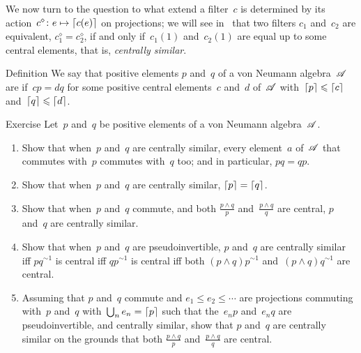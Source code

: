 \documentclass[a]{subfiles}
\begin{document}
\begin{parsec}%
\begin{point}%
We now turn to the question
to what extend a filter~$c$ is determined by
its action~$c^\diamond\colon e\mapsto \left\lceil c(e)\right\rceil$ on projections;
we will see in~\TODO{}
that two filters $c_1$ and~$c_2$
are equivalent, $c_1^\diamond = c_2^\diamond$,
if and only if~$c_1(1)$ and~$c_2(1)$
are equal up to some central elements,
that is, \emph{centrally similar}.
\end{point}
\begin{point}{Definition}%
We say that positive elements $p$ and~$q$ of a von Neumann algebra~$\mathscr{A}$
are 
if~$cp=dq$ for some positive central elements~$c$ and~$d$ of~$\mathscr{A}$
with~$\left\lceil p\right\rceil\leqslant \left\lceil c\right\rceil$
and~$\left\lceil q\right\rceil\leqslant \left\lceil d\right\rceil$.
\end{point}
\begin{point}{Exercise}%
Let~$p$ and~$q$ be positive elements
of a von Neumann algebra~$\mathscr{A}$.
\begin{enumerate}
\item
Show that when~$p$ and~$q$ are centrally similar,
every element~$a$ of~$\mathscr{A}$ that commutes
with~$p$ commutes with~$q$ too;
and in particular, $pq=qp$.
\item
Show that when~$p$ and~$q$ are centrally similar,
$\left\lceil p\right\rceil=\left\lceil q\right\rceil$.
\item
Show that when~$p$ and~$q$ commute,
and both $\frac{p\wedge q}{p}$ 
and~$\frac{p\wedge q}{q}$
are central,
$p$ and~$q$ are centrally similar.
\item
Show that when~$p$ and~$q$ are pseudoinvertible,
$p$ and~$q$ are centrally similar iff
$pq^{\sim 1}$ is central
iff $qp^{\sim 1}$ is central
iff both $(p\wedge q)p^{\sim 1}$
and~$(p\wedge q)q^{\sim 1}$ are central.
\item
Assuming that $p$ and~$q$ commute
and $e_1 \leq e_2 \leq \dotsb$
are projections commuting with~$p$ and~$q$
with~$\bigcup_n e_n=\left\lceil p\right\rceil$
such that the~$e_np$ and~$e_nq$
are pseudoinvertible,
and centrally similar,
show that $p$ and~$q$ are centrally similar
on the 
grounds that both  $\frac{p\wedge q}{p}$
and~$\frac{p\wedge q}{q}$ are central.


\end{enumerate}
\end{point}
\end{parsec}
\end{document}
